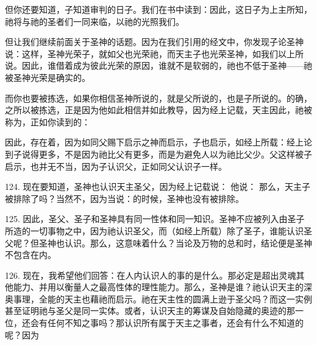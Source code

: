 但你还要知道，子知道审判的日子。我们在书中读到：因此，这日子为上主所知，祂将与祂的圣者们一同来临，以祂的光照我们。\par

但让我们继续前面关于圣神的话题。因为在我们引用的经文中，你发现子论圣神说：这样，圣神光荣子，就如父也光荣祂，而天主子也光荣圣神，如我们以上所说。因此，谁借着成为彼此光荣的原因，谁就不是软弱的，祂也不低于圣神——祂被圣神光荣是确实的。\par

而你也要被拣选，如果你相信圣神所说的，就是父所说的，也是子所说的。的确，之所以被拣选，正是因为他如此相信并如此教导，因为经上记载，天主因此，祂被称为，正如你读到的：\par

因此，存在着，因为如同父赐下启示之神而启示，子也启示，如经上所载：经上论到子说得更多，不是因为祂比父有更多，而是为避免人以为祂比父少。父这样被子启示，也并无不当，因为子认识父，正如同父认识子一样。\par

124. 现在要知道，圣神也认识天主圣父，因为经上记载说： 他说： 那么，天主子被排除了吗？当然不，因为当说：的时候，圣神也没有被排除。\par

125. 因此，圣父、圣子和圣神具有同一性体和同一知识。圣神不应被列入由圣子所造的一切事物之中，因为祂认识圣父，而（如经上所载）除了圣子，谁能认识圣父呢？但圣神也认识。那么，这意味着什么？当论及万物的总和时，结论便是圣神不包含在内。\par

126. 现在，我希望他们回答：在人内认识人的事的是什么。那必定是超出灵魂其他能力、并用以衡量人之最高性体的理性能力。那么，圣神是谁？祂认识天主的深奥事理，全能的天主也藉祂而启示。祂在天主性的圆满上逊于圣父吗？而这一实例甚至证明祂与圣父是同一实体。或者，认识天主的筹谋及自始隐藏的奥迹的那一位，还会有任何不知之事吗？那认识所有属于天主之事者，还会有什么不知道的呢？因为\par

